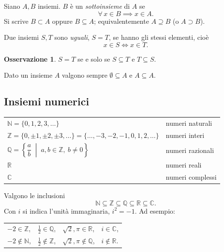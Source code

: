 \documentclass[11pt,a4paper]{article}
\theoremstyle{definition}
\newtheorem*{osservazione}{Osservazione}
\begin{document}
\begin{definizione}
Siano $A, B$ insiemi. $B$ è un \emph{sottoinsieme} di $A$ se
\[
\forall\, x \in B \implies x \in A.
\]
Si scrive $B \subset A$ oppure $B \subseteq A$; equivalentemente
$A \supseteq B$ (o $A \supset B$).
\end{definizione}

\begin{definizione}
Due insiemi $S, T$ sono \emph{uguali}, $S = T$, se hanno gli stessi
elementi, cioè
\[
x \in S \iff x \in T.
\]
\end{definizione}

\begin{osservazione}
$S = T$ se e solo se $S \subseteq T$ e $T \subseteq S$.
\end{osservazione}

Dato un insieme $A$ valgono sempre $\emptyset \subseteq A$ e
$A \subseteq A$.

\subsection*{Insiemi numerici}

\begin{center}
\begin{tabular}{ll}
$\mathbb{N} = \{0, 1, 2, 3, \dots\}$ & numeri naturali \\
$\mathbb{Z} = \{0, \pm 1, \pm 2, \pm 3, \dots\}
              = \{\dots, -3, -2, -1, 0, 1, 2, \dots\}$ & numeri interi \\
$\mathbb{Q} = \left\{ \dfrac{a}{b} \;\middle|\; a, b \in \mathbb{Z},\
              b \neq 0 \right\}$ & numeri razionali \\
$\mathbb{R}$ & numeri reali \\
$\mathbb{C}$ & numeri complessi
\end{tabular}
\end{center}

Valgono le inclusioni
\[
\mathbb{N} \subseteq \mathbb{Z} \subseteq \mathbb{Q} \subseteq
\mathbb{R} \subseteq \mathbb{C}.
\]
Con $i$ si indica l'unità immaginaria, $i^2 = -1$. Ad esempio:
\begin{center}
\begin{tabular}{llll}
$-2 \in \mathbb{Z}$, & $\frac12 \in \mathbb{Q}$, &
$\sqrt{2}, \pi \in \mathbb{R}$, & $i \in \mathbb{C}$, \\
$-2 \notin \mathbb{N}$, & $\frac12 \notin \mathbb{Z}$, &
$\sqrt{2}, \pi \notin \mathbb{Q}$, & $i \notin \mathbb{R}$.
\end{tabular}
\end{center}
\end{document}
